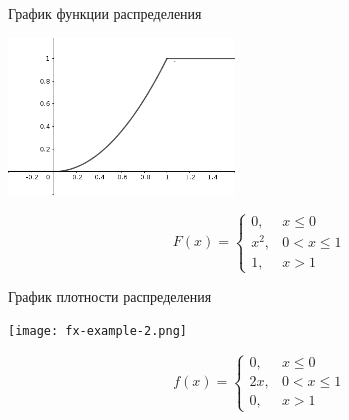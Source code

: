 \documentclass[unicode,11pt,notheorems,xcolor=table]{beamer}
\begin{document}
\begin{frame}{График функции распределения}{}
    \begin{minipage}{6.5cm}
        \includegraphics[width=6cm]{fx-example-1.png}
    \end{minipage}
    \begin{minipage}{4cm}
    $$ F(x) = \begin{cases}
        0, & x\leqslant 0\\
        x^2, & 0<x\leqslant 1\\
        1, &  x>1
    \end{cases}
    $$        
    \end{minipage}
\end{frame}

\begin{frame}{График плотности распределения}{}
    \begin{minipage}{6.5cm}
        \texttt{[image: fx-example-2.png]}
    \end{minipage}
    \begin{minipage}{4cm}
    $$f(x) = \begin{cases}
        0, & x\leqslant 0\\
        2x, & 0<x\leqslant 1\\
        0, &  x>1
    \end{cases}
    $$        
    \end{minipage}
\end{frame}
\end{document}
